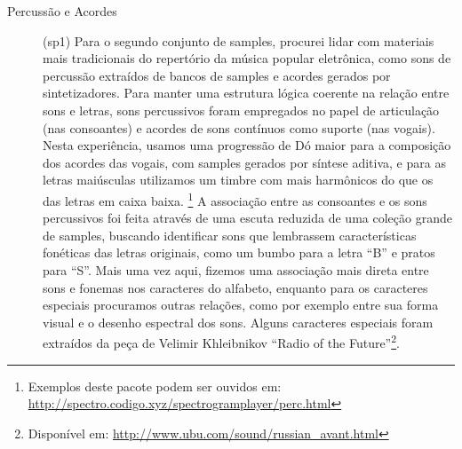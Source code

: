 \begin{description}
\item[Percussão e Acordes] (sp1) Para o segundo conjunto de samples, procurei lidar com materiais mais tradicionais do repertório da música popular eletrônica, como sons de percussão extraídos de bancos de samples e acordes gerados por sintetizadores. Para manter uma estrutura lógica coerente na relação entre sons e letras, sons percussivos foram empregados no papel de articulação (nas consoantes) e acordes de sons contínuos como suporte (nas vogais). Nesta experiência, usamos uma progressão de Dó maior para a composição dos acordes das vogais, com samples gerados por síntese aditiva, e para as letras maiúsculas utilizamos um timbre com mais harmônicos do que os das letras em caixa baixa. \footnote{Exemplos deste pacote podem ser ouvidos em: \url{http://spectro.codigo.xyz/spectrogramplayer/perc.html} }
A associação entre as consoantes e os sons percussivos foi feita através de uma escuta reduzida de uma coleção grande de samples, buscando identificar sons que lembrassem características fonéticas das letras originais, como um bumbo para a letra ``B'' e pratos para ``S''. Mais uma vez aqui, fizemos uma associação mais direta entre sons e fonemas nos caracteres do alfabeto, enquanto para os caracteres especiais procuramos outras relações, como por exemplo entre sua forma visual e o desenho espectral dos sons. Alguns caracteres especiais foram extraídos da peça de Velimir Khleibnikov ``Radio of the Future''\footnote{Disponível em: \url{http://www.ubu.com/sound/russian_avant.html}}.


\end{description}
